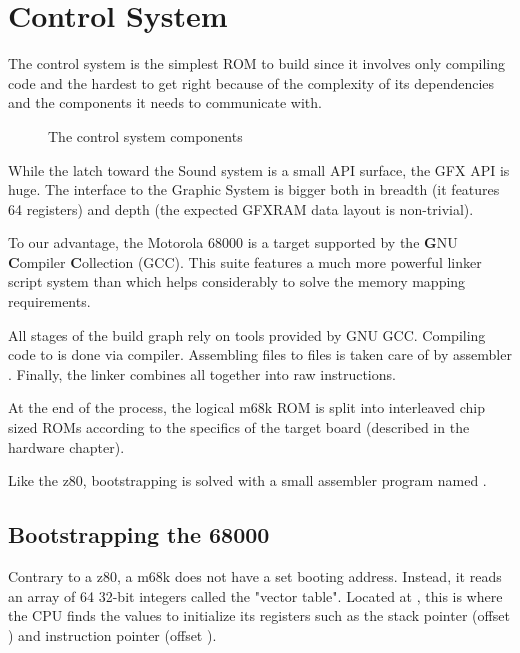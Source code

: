 \chapter{Control System}
The control system is the simplest ROM to build since it involves only compiling code and the hardest to get right because of the complexity of its dependencies and the components it needs to communicate with. 

\begin{figure}[H]
\caption*{The control system components}
\end{figure}

While the latch toward the Sound system is a small API surface, the GFX API is huge. The interface to the Graphic System is bigger both in breadth (it features 64 registers) and depth (the expected GFXRAM data layout is non-trivial).

To our advantage, the Motorola 68000 is a target supported by the \textbf{G}NU \textbf{C}ompiler \textbf{C}ollection (GCC). This suite features a much more powerful linker script system than  which helps considerably to solve the memory mapping requirements.

All stages of the build graph rely on tools provided by GNU GCC. Compiling  code to  is done via  compiler. Assembling  files to  files is taken care of by  assembler . Finally, the  linker combines all  together into raw instructions. 





At the end of the process, the logical m68k ROM is split into interleaved chip sized ROMs according to the specifics of the target board (described in the hardware chapter).

Like the z80, bootstrapping is solved with a small assembler program named .

\section{Bootstrapping the 68000}
Contrary to a z80, a m68k does not have a set booting address. Instead, it reads an array of 64 32-bit integers called the "vector table". Located at , this is where the CPU finds the values to initialize its registers such as the stack pointer (offset ) and instruction pointer (offset ).

